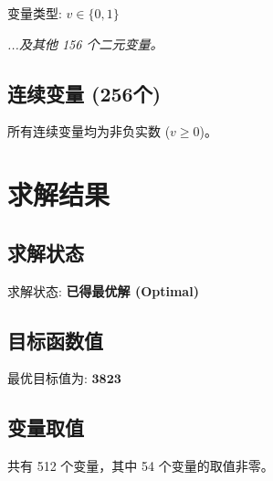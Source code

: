\documentclass[a4paper,10pt]{article}
\begin{document}
变量类型: $v \in \{0,1\}$

\textit{...及其他 156 个二元变量。}

\subsection{连续变量 (256个)}

所有连续变量均为非负实数 ($v \geq 0$)。

\section{求解结果}

\subsection{求解状态}

求解状态: \textbf{已得最优解 (Optimal)}

\subsection{目标函数值}

最优目标值为: $\mathbf{3823}$

\subsection{变量取值}

共有 512 个变量，其中 54 个变量的取值非零。
\end{document}

